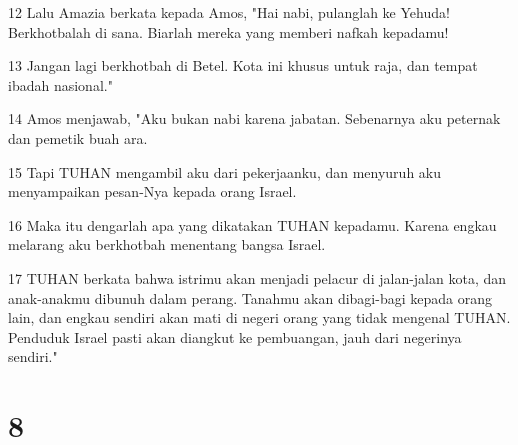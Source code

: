 \par 12 Lalu Amazia berkata kepada Amos, "Hai nabi, pulanglah ke Yehuda! Berkhotbalah di sana. Biarlah mereka yang memberi nafkah kepadamu!
\par 13 Jangan lagi berkhotbah di Betel. Kota ini khusus untuk raja, dan tempat ibadah nasional."
\par 14 Amos menjawab, "Aku bukan nabi karena jabatan. Sebenarnya aku peternak dan pemetik buah ara.
\par 15 Tapi TUHAN mengambil aku dari pekerjaanku, dan menyuruh aku menyampaikan pesan-Nya kepada orang Israel.
\par 16 Maka itu dengarlah apa yang dikatakan TUHAN kepadamu. Karena engkau melarang aku berkhotbah menentang bangsa Israel.
\par 17 TUHAN berkata bahwa istrimu akan menjadi pelacur di jalan-jalan kota, dan anak-anakmu dibunuh dalam perang. Tanahmu akan dibagi-bagi kepada orang lain, dan engkau sendiri akan mati di negeri orang yang tidak mengenal TUHAN. Penduduk Israel pasti akan diangkut ke pembuangan, jauh dari negerinya sendiri."

\chapter{8}

